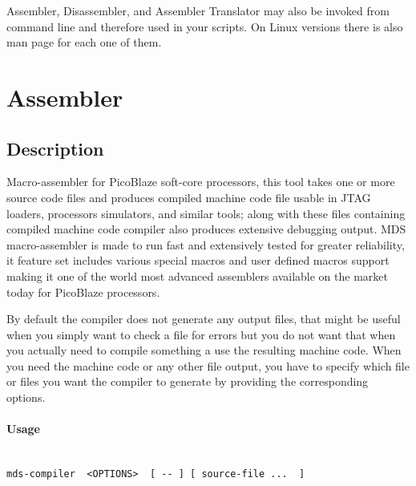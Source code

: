 Assembler, Disassembler, and Assembler Translator may also be invoked from command line and therefore used in your scripts. On Linux versions there is also man page for each one of them.

\section{Assembler}
    \subsection{Description}
        Macro-assembler for PicoBlaze soft-core processors, this tool takes one or more source code files and produces compiled machine code file usable in JTAG loaders, processors simulators, and similar tools; along with these files containing compiled machine code compiler also produces extensive debugging output. MDS macro-assembler is made to run fast and extensively tested for greater reliability, it feature set includes various special macros and user defined macros support making it one of the world most advanced assemblers available on the market today for PicoBlaze processors.

        By default the compiler does not generate any output files, that might be useful when you simply want to check a file for errors but you do not want that when you actually need to compile something a use the resulting machine code. When you need the machine code or any other file output, you have to specify which file or files you want the compiler to generate by providing the corresponding options.

    \paragraph{Usage}~\\
        \verb'mds-compiler  <OPTIONS>  [ -- ] [ source-file ...  ]'

